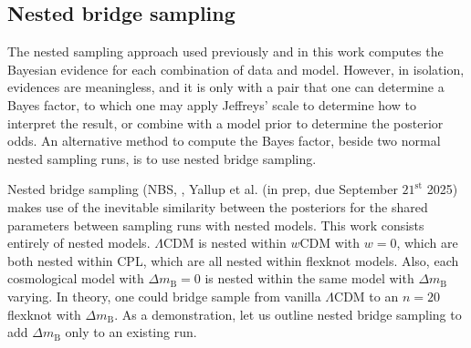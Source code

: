 \documentclass[fleqn,usenatbib]{mnras}
\newcommand{\lcdm}{$\Lambda$CDM}
\newcommand{\dmb}{\ensuremath{\Delta m_\mathrm B}}
\begin{document}
    \subsection{Nested bridge sampling}

    The nested sampling approach used previously and in this work computes the Bayesian evidence for each combination of data and model.
    However, in isolation, evidences are meaningless, and it is only with a pair that one can determine a Bayes factor, to which one may apply Jeffreys' scale \citep{jeffreys1939theory} to determine how to interpret the result, or combine with a model prior to determine the posterior odds.
    An alternative method to compute the Bayes factor, beside two normal nested sampling runs, is to use nested bridge sampling.

    Nested bridge sampling (NBS, \cite{chen2000monte, bridgetutorial}, Yallup et al. (in prep, due September $21^\text{st}$ 2025) makes use of the inevitable similarity between the posteriors for the shared parameters between sampling runs with nested models.
    This work consists entirely of nested models.
    \lcdm{} is nested within $w$CDM with $w=0$, which are both nested within CPL, which are all nested within flexknot models.
    Also, each cosmological model with $\dmb{}=0$ is nested within the same model with \dmb{} varying.
    In theory, one could bridge sample from vanilla \lcdm{} to an $n=20$ flexknot with \dmb{}.
    As a demonstration, let us outline nested bridge sampling to add \dmb{} only to an existing run.
\end{document}
